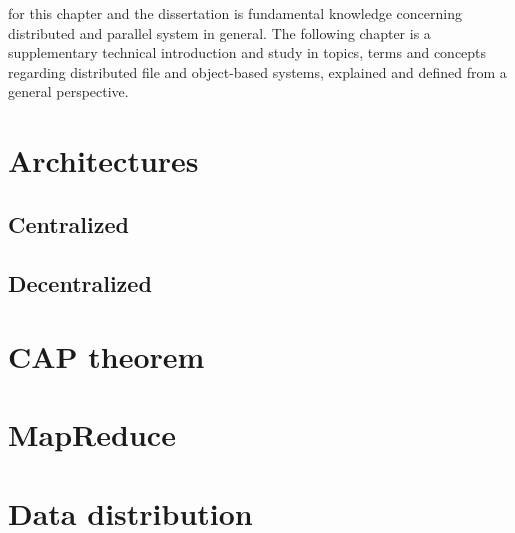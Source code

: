  for this chapter and the dissertation is fundamental knowledge concerning distributed and parallel system in general. The following chapter is a supplementary technical introduction and study in topics, terms and concepts regarding distributed file and object-based systems, explained and defined from a general perspective.

\section{Architectures} \label{sec:architectures}

\subsection*{Centralized}

\subsection*{Decentralized}

\section{CAP theorem} \label{sec:cap}

\section{MapReduce} \label{sec:mapreduce}

\section{Data distribution} \label{sec:dd}
